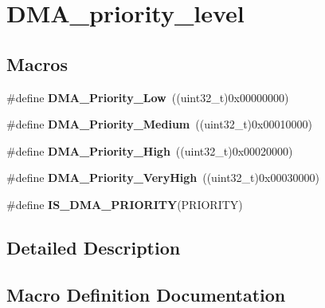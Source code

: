 \hypertarget{group___d_m_a__priority__level}{}\section{D\+M\+A\+\_\+priority\+\_\+level}
\label{group___d_m_a__priority__level}
\subsection*{Macros}
\begin{DoxyCompactItemize}
\item 
\hypertarget{group___d_m_a__priority__level_gaf414e0aa8dd42aee6f83f88ab6175179}{}\#define {\bfseries D\+M\+A\+\_\+\+Priority\+\_\+\+Low}~((uint32\+\_\+t)0x00000000)\label{group___d_m_a__priority__level_gaf414e0aa8dd42aee6f83f88ab6175179}

\item 
\hypertarget{group___d_m_a__priority__level_ga8e0d4a958f4288c6c759945789490f38}{}\#define {\bfseries D\+M\+A\+\_\+\+Priority\+\_\+\+Medium}~((uint32\+\_\+t)0x00010000)\label{group___d_m_a__priority__level_ga8e0d4a958f4288c6c759945789490f38}

\item 
\hypertarget{group___d_m_a__priority__level_gae2441c0b4d4ba9945a6f4f7d08045a8e}{}\#define {\bfseries D\+M\+A\+\_\+\+Priority\+\_\+\+High}~((uint32\+\_\+t)0x00020000)\label{group___d_m_a__priority__level_gae2441c0b4d4ba9945a6f4f7d08045a8e}

\item 
\hypertarget{group___d_m_a__priority__level_gadccd2f8b2ac24ba4fd485dd5b9b48671}{}\#define {\bfseries D\+M\+A\+\_\+\+Priority\+\_\+\+Very\+High}~((uint32\+\_\+t)0x00030000)\label{group___d_m_a__priority__level_gadccd2f8b2ac24ba4fd485dd5b9b48671}

\item 
\#define {\bfseries I\+S\+\_\+\+D\+M\+A\+\_\+\+P\+R\+I\+O\+R\+I\+T\+Y}(P\+R\+I\+O\+R\+I\+T\+Y)
\end{DoxyCompactItemize}


\subsection{Detailed Description}


\subsection{Macro Definition Documentation}
\hypertarget{group___d_m_a__priority__level_gaa1cae2ab458948511596467c87cd02b6}{}
